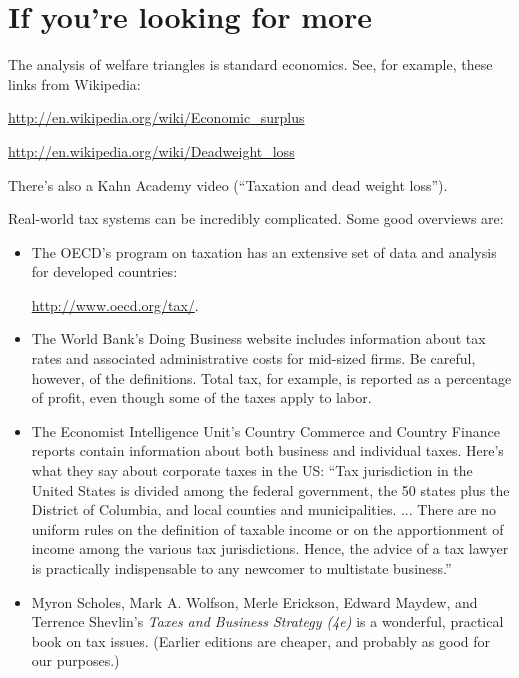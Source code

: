 \section*{If you're looking for more}

The analysis of welfare triangles is standard economics.
See, for example, these links from Wikipedia:

\vspace*{\parskip}
\centerline{\url{http://en.wikipedia.org/wiki/Economic_surplus}}
\centerline{\url{http://en.wikipedia.org/wiki/Deadweight_loss}}

There's also a Kahn Academy video (``Taxation and dead weight loss'').

Real-world tax systems can be incredibly complicated.
Some good overviews are:
%
\begin{itemize}
\item The OECD's program on taxation  has an extensive
set of data and analysis for developed countries:

\vspace*{\parskip}
\centerline{\url{http://www.oecd.org/tax/}.}

\item The World Bank's Doing Business website includes information about
tax rates and associated administrative costs for mid-sized firms.
Be careful, however, of the definitions.
Total tax, for example, is reported as a percentage of
profit, even though some of the taxes
apply to labor.


\item The Economist Intelligence Unit's Country Commerce
and Country Finance reports contain information about
both business and individual taxes.
Here's what they say about corporate taxes in the US:
``Tax jurisdiction in the United States is divided among the federal
government, the 50 states plus the District of Columbia,
and local counties and municipalities. ...
There are no uniform rules on the definition of taxable income or on the
apportionment of income among the various tax jurisdictions.
Hence, the advice of a tax lawyer is practically indispensable
to any newcomer to multistate business.''

\item
 Myron Scholes, Mark A. Wolfson, Merle Erickson, Edward Maydew, and
 Terrence Shevlin's {\it Taxes and Business Strategy (4e)\/}
 is a wonderful, practical book on tax issues.
 (Earlier editions are cheaper, and probably as good for our purposes.)

\end{itemize}

